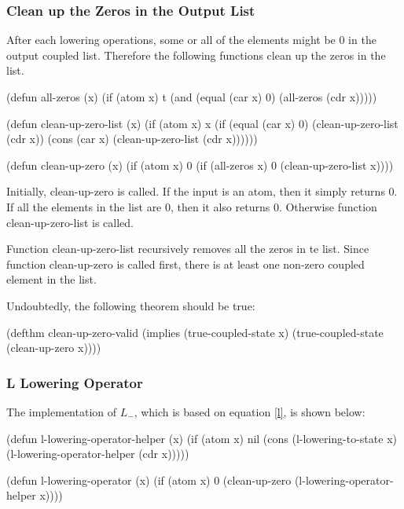 \documentclass[12pt,journal,compsoc]{IEEEtran}
\begin{document}
\subsubsection{Clean up the Zeros in the Output List}

After each lowering operations, some or all of the elements might be 0 in the output coupled list. Therefore the following functions clean up the zeros in the list.

\begin{acl2-lst}
(defun all-zeros (x)
 (if (atom x)
  t
  (and (equal (car x) 0)
   (all-zeros (cdr x)))))

(defun clean-up-zero-list (x) 
 (if (atom x)
  x
  (if (equal (car x) 0)
   (clean-up-zero-list (cdr x))
   (cons (car x)
    (clean-up-zero-list (cdr x))))))

(defun clean-up-zero (x)
 (if (atom x)
  0
  (if (all-zeros x)
   0
   (clean-up-zero-list x))))
\end{acl2-lst}

Initially, clean-up-zero is called. If the input is an atom, then it simply returns 0. If all the elements in the list are 0, then it also returns 0. Otherwise function clean-up-zero-list is called.

Function clean-up-zero-list recursively removes all the zeros in te list. Since function clean-up-zero is called first, there is at least one non-zero coupled element in the list.

Undoubtedly, the following theorem should be true:

\begin{acl2-lst}
(defthm clean-up-zero-valid 
 (implies (true-coupled-state x)
  (true-coupled-state (clean-up-zero x))))
\end{acl2-lst}


\subsubsection{L Lowering Operator}

The implementation of $L_-$, which is based on equation \ref{l}, is shown below:

\begin{acl2-lst}
(defun l-lowering-operator-helper (x)
 (if (atom x)
  nil
  (cons (l-lowering-to-state x) 
   (l-lowering-operator-helper (cdr x)))))

(defun l-lowering-operator (x)
 (if (atom x)
  0
  (clean-up-zero (l-lowering-operator-helper x))))
\end{acl2-lst}
\end{document}

